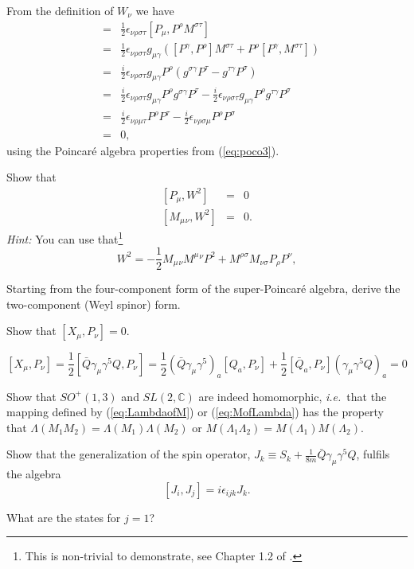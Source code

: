 \documentclass[notes.tex]{subfiles}
\begin{document}
\begin{Answer} 
From the definition of $W_\nu$ we have
\begin{eqnarray*}
[P_\mu,W_\nu] &=& \frac{1}{2}\epsilon_{\nu\rho\sigma\tau}[P_\mu,P^\rho M^{\sigma\tau}] \\
&=& \frac{1}{2}\epsilon_{\nu\rho\sigma\tau}g_{\mu\gamma}([P^\gamma,P^\rho]M^{\sigma\tau} + P^\rho[P^\gamma, M^{\sigma\tau}] )\\
&=& \frac{i}{2}\epsilon_{\nu\rho\sigma\tau}g_{\mu\gamma}P^\rho(g^{\sigma\gamma} P^\tau-g^{\tau\gamma}P^\sigma)\\
&=& \frac{i}{2}\epsilon_{\nu\rho\sigma\tau}g_{\mu\gamma}P^\rho g^{\sigma\gamma} P^\tau-\frac{i}{2}\epsilon_{\nu\rho\sigma\tau}g_{\mu\gamma}P^\rho g^{\tau\gamma}P^\sigma\\
&=& \frac{i}{2}\epsilon_{\nu\rho\mu\tau}P^\rho  P^\tau-\frac{i}{2}\epsilon_{\nu\rho\sigma\mu}P^\rho P^\sigma\\
&=& 0,
\end{eqnarray*}
using the Poincaré algebra properties from (\ref{eq:poco3}).
\end{Answer}


\begin{Exercise}[]
Show that
\begin{eqnarray}
\left[P_\mu, W^2\right] &=& 0 \\
\left[M_\mu{}_\nu, W^2\right] &=& 0.
\end{eqnarray}
{\it Hint:} You can use that\footnote{This is non-trivial to demonstrate, see Chapter 1.2 of \cite{IntrSUSY2010}.}
 \[W^2 = -\frac{1}{2} M_\mu{}_\nu M^{\mu}{}^{\nu}P^2 + M^{\rho\sigma}M_{\nu\sigma}P_\rho P^\nu, \]
\end{Exercise}


\begin{Exercise}[]
Starting from the four-component form of the super-Poincaré algebra, derive the two-component (Weyl spinor) form.
\end{Exercise}


\begin{Exercise}[]
Show that $[X_\mu,P_\nu]=0$.
\end{Exercise}

\begin{Answer} 
\[
[X_\mu,P_\nu]=\frac{1}{2}[\bar Q\gamma_\mu\gamma^5Q,P_\nu]=\frac{1}{2}(\bar Q\gamma_\mu\gamma^5)_a[Q_a,P_\nu]+\frac{1}{2}[\bar Q_a,P_\nu](\gamma_\mu\gamma^5Q)_a=0
\]
\end{Answer}

\begin{Exercise}[]
Show that $SO^+(1,3)$ and $SL(2, \mathbb{C})$ are indeed homomorphic, {\it i.e.}\ that the mapping defined by (\ref{eq:LambdaofM}) or (\ref{eq:MofLambda}) has the property that $\Lambda(M_1M_2)=\Lambda(M_1)\Lambda(M_2)$ or $M(\Lambda_1\Lambda_2)=M(\Lambda_1)M(\Lambda_2)$.
\end{Exercise}

\begin{Exercise}[]
Show that the generalization of the spin operator, $J_k\equiv S_k + \frac{1}{8m}\bar{Q}\gamma_\mu \gamma^5 Q$, fulfils the algebra
\[[J_i, J_j] = i\epsilon_{ijk}J_k.\]
\end{Exercise}

\begin{Exercise}[]
What are the states for $j=1$?
\end{Exercise}
\end{document}
